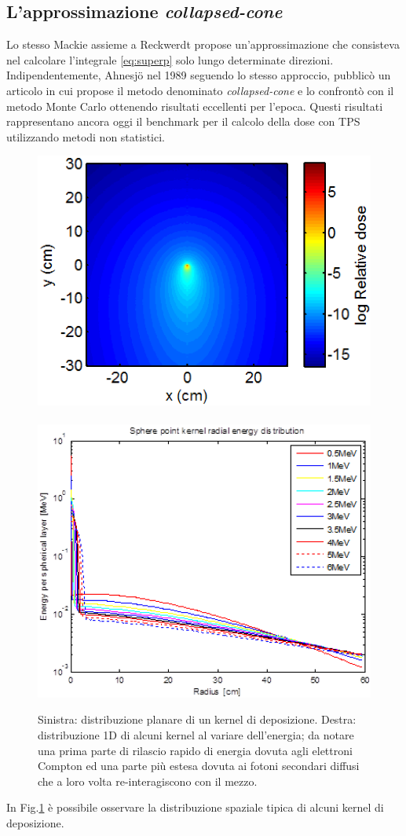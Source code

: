 {\subsection{L'approssimazione \textit{collapsed-cone}}
Lo stesso Mackie assieme a Reckwerdt \cite{Reckwerdt1992} propose un'approssimazione che consisteva nel calcolare l'integrale \eqref{eq:superp} solo lungo determinate direzioni. Indipendentemente, Ahnesj\"{o} nel 1989 seguendo lo stesso approccio, pubblicò un articolo \cite{Ahnesjo1989} in cui propose il metodo denominato \textit{collapsed-cone} e lo confrontò con il metodo Monte Carlo ottenendo risultati eccellenti per l'epoca. Questi risultati rappresentano ancora oggi il benchmark per il calcolo della dose con TPS utilizzando metodi non statistici.
\begin{figure}[!t]
\centering
\includegraphics[width=.45\textwidth]{./cap1/kern_ray1.png}$\quad$
\includegraphics[width=.45\textwidth]{./cap1/kern_ray2.png}
\caption{Sinistra: distribuzione planare di un kernel di deposizione. Destra: distribuzione 1D di alcuni kernel al variare dell'energia; da notare una prima parte di rilascio rapido di energia dovuta agli elettroni Compton ed una parte più estesa dovuta ai fotoni secondari diffusi che a loro volta re-interagiscono con il mezzo.}
\label{fig:kern_ray}
\end{figure}
In Fig.\ref{fig:kern_ray} è possibile osservare la distribuzione spaziale tipica di alcuni kernel di deposizione.

}
